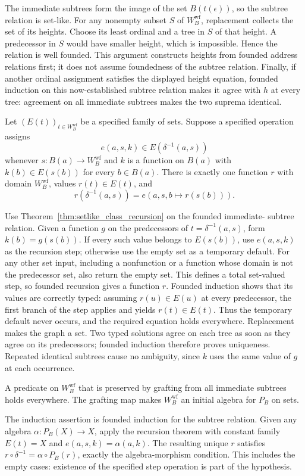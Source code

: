 The immediate subtrees form the image of the set $B(t(\epsilon))$,
so the subtree relation is set-like. For any nonempty subset $S$ of
$W_B^{\mathrm{wf}}$, replacement collects the set of its heights.
Choose its least ordinal and a tree in $S$ of that height. A predecessor
in $S$ would have smaller height, which is impossible. Hence the relation
is well founded. This argument constructs heights from founded address
relations first; it does not assume foundedness of the subtree relation.
Finally, if another ordinal assignment satisfies the displayed height
equation, founded induction on this now-established subtree relation
makes it agree with $h$ at every tree: agreement on all immediate
subtrees makes the two suprema identical.
\Done

\begin{theorem}
\label{thm:general_W_recursion}
Let $(E(t))_{t\in W_B^{\mathrm{wf}}}$ be a specified family of sets. Suppose a
specified operation assigns
\[
e(a,s,k)\in E(\delta^{-1}(a,s))
\]
whenever $s:B(a)\to W_B^{\mathrm{wf}}$ and $k$ is a function on $B(a)$
with $k(b)\in E(s(b))$ for every $b\in B(a)$. There is exactly one function
$r$ with domain $W_B^{\mathrm{wf}}$, values $r(t)\in E(t)$, and
\[
r(\delta^{-1}(a,s))=e(a,s,b\mapsto r(s(b))).
\]
\end{theorem}
\Proof
Use Theorem~\ref{thm:setlike_class_recursion} on the founded immediate-
subtree relation. Given a function $g$ on the predecessors of
$t=\delta^{-1}(a,s)$, form $k(b)=g(s(b))$. If every such value belongs
to $E(s(b))$, use $e(a,s,k)$ as the recursion step; otherwise use the
empty set as a temporary default. For any other set input, including
a nonfunction or a function whose domain is not the predecessor set,
also return the empty set. This defines a total set-valued step,
so founded recursion gives a function $r$.
Founded induction shows that its values are correctly typed: assuming
$r(u)\in E(u)$ at every predecessor, the first branch of the step applies
and yields $r(t)\in E(t)$. Thus the temporary default never occurs,
and the required equation holds everywhere. Replacement makes the graph
a set. Two typed solutions agree on each tree as soon as they agree
on its predecessors; founded induction therefore proves uniqueness.
Repeated identical subtrees cause no ambiguity, since $k$ uses the same
value of $g$ at each occurrence.
\Done

\begin{corollary}
A predicate on $W_B^{\mathrm{wf}}$ that is preserved by grafting from
all immediate subtrees holds everywhere. The grafting map makes
$W_B^{\mathrm{wf}}$ an initial algebra for $P_B$ on sets.
\end{corollary}
\Proof
The induction assertion is founded induction for the subtree relation.
Given any algebra $\alpha:P_B(X)\to X$, apply the recursion theorem
with constant family $E(t)=X$ and $e(a,s,k)=\alpha(a,k)$.
The resulting unique $r$ satisfies
$r\circ\delta^{-1}=\alpha\circ P_B(r)$, exactly the algebra-morphism
condition. This includes the empty cases: existence of the specified
step operation is part of the hypothesis.
\Done

